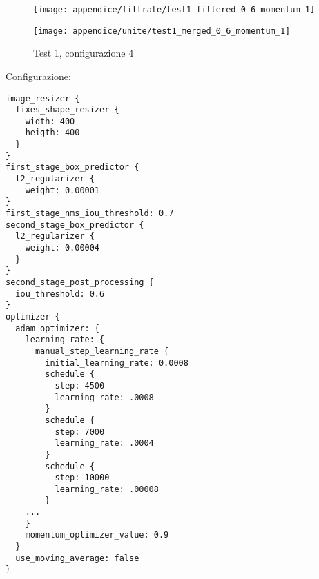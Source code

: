 \newpage
\begin{figure}[H]  
    \begin{minipage}{.5\columnwidth}  
        \centering  
        \texttt{[image: appendice/filtrate/test1\_filtered\_0\_6\_momentum\_1]}  
    \end{minipage}%
    \begin{minipage}{0.5\columnwidth}  
        \centering  
        \texttt{[image: appendice/unite/test1\_merged\_0\_6\_momentum\_1]}  
    \end{minipage}  
    \caption{Test 1, configurazione 4}
\end{figure}%
Configurazione:
\begin{multicols}{2}
    \begin{lstlisting}
image_resizer {
  fixes_shape_resizer {
    width: 400
    heigth: 400
  }
}
first_stage_box_predictor {
  l2_regularizer {
    weight: 0.00001
}
first_stage_nms_iou_threshold: 0.7
second_stage_box_predictor {
  l2_regularizer {
    weight: 0.00004
  }
}
second_stage_post_processing {
  iou_threshold: 0.6
}
optimizer {
  adam_optimizer: {
    learning_rate: {
      manual_step_learning_rate {
        initial_learning_rate: 0.0008
        schedule {
          step: 4500
          learning_rate: .0008
        }
        schedule {
          step: 7000
          learning_rate: .0004
        }
        schedule {
          step: 10000
          learning_rate: .00008
        }
    ...
    }
    momentum_optimizer_value: 0.9
  }
  use_moving_average: false
}
    \end{lstlisting}
\end{multicols}

